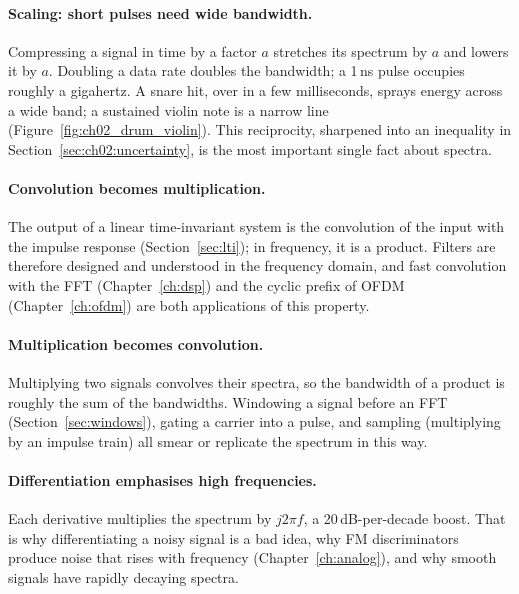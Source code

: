 \paragraph{Scaling: short pulses need wide bandwidth.} Compressing a signal in time by a factor
$a$ stretches its spectrum by $a$ and lowers it by $a$. Doubling a data rate doubles the
bandwidth; a 1\,ns pulse occupies roughly a gigahertz. A snare hit, over in a few milliseconds,
sprays energy across a wide band; a sustained violin note is a narrow line
(Figure~\ref{fig:ch02_drum_violin}). This reciprocity, sharpened into an inequality in
Section~\ref{sec:ch02:uncertainty}, is the most important single fact about spectra.


\paragraph{Convolution becomes multiplication.} The output of a linear time-invariant system is
the convolution of the input with the impulse response (Section~\ref{sec:lti}); in frequency, it
is a product. Filters are therefore designed and understood in the frequency domain, and fast
convolution with the FFT (Chapter~\ref{ch:dsp}) and the cyclic prefix of OFDM
(Chapter~\ref{ch:ofdm}) are both applications of this property.


\paragraph{Multiplication becomes convolution.} Multiplying two signals convolves their spectra,
so the bandwidth of a product is roughly the sum of the bandwidths. Windowing a signal before an
FFT (Section~\ref{sec:windows}), gating a carrier into a pulse, and sampling (multiplying by an
impulse train) all smear or replicate the spectrum in this way.

\paragraph{Differentiation emphasises high frequencies.} Each derivative multiplies the spectrum
by $j2\pi f$, a 20\,dB-per-decade boost. That is why differentiating a noisy signal is a bad idea,
why FM discriminators produce noise that rises with frequency (Chapter~\ref{ch:analog}), and why
smooth signals have rapidly decaying spectra.

